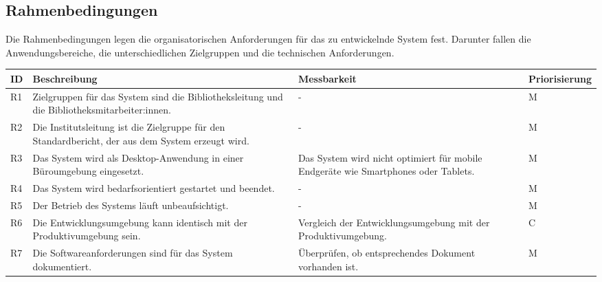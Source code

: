 \subsection{Rahmenbedingungen}
Die Rahmenbedingungen legen die organisatorischen Anforderungen für das zu entwickelnde System fest. 
Darunter fallen die Anwendungsbereiche, die unterschiedlichen Zielgruppen und die technischen Anforderungen. 
\begingroup
\setlength{\tabcolsep}{10pt} %
\renewcommand{\arraystretch}{1.25} 
\begin{table}[h]
    \centering
    \begin{adjustbox}{max width=\textwidth}
    \begin{tabular}{lp{7.5cm}p{7.5cm}l}
       \toprule
       \textbf{ID}          & \textbf{Beschreibung} & \textbf{Messbarkeit} & \textbf{Priorisierung}\\
       \midrule
        R1                                &Zielgruppen für das System sind die Bibliotheksleitung und die Bibliotheksmitarbeiter:innen. & -  & M\\
        R2                                &Die Institutsleitung ist die Zielgruppe für den Standardbericht, der aus dem System erzeugt wird. & -  & M\\
        R3                                &Das System wird als Desktop-Anwendung in einer Büroumgebung eingesetzt. & Das System wird nicht optimiert für mobile Endgeräte wie Smartphones oder Tablets. & M\\
        R4                                &Das System wird bedarfsorientiert gestartet und beendet. & -  & M\\
        R5                                &Der Betrieb des Systems läuft unbeaufsichtigt. & -  & M\\
        R6                                &Die Entwicklungsumgebung kann identisch mit der Produktivumgebung sein. & Vergleich der Entwicklungsumgebung mit der Produktivumgebung.  & C\\
        R7                                &Die Softwareanforderungen sind für das System dokumentiert. & Überprüfen, ob entsprechendes Dokument vorhanden ist.  & M\\

\end{tabular}
\end{adjustbox}
\end{table}
